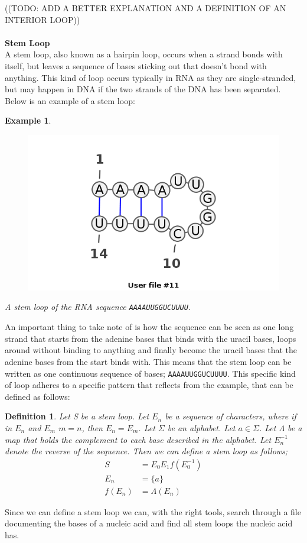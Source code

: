\documentclass{article}
\newtheorem{myex}{Example}
\newtheorem{mydef}{Definition}
\begin{document}
((TODO: ADD A BETTER EXPLANATION AND A DEFINITION OF AN INTERIOR LOOP))
\\\\
\textbf{Stem Loop}\\
A stem loop, also known as a hairpin loop, occurs when a strand bonds with 
itself, but leaves a sequence of bases sticking out that doesn't bond with anything. 
This kind of loop occurs typically in RNA as they are single-stranded, but may 
happen in DNA if the two strands of the DNA has been separated. Below is an 
example of a stem loop:
\begin{myex}\centering
\begin{figure}[h]
\includegraphics[scale=0.5]{./lib/stem-loop.png}
\end{figure}
A stem loop of the RNA sequence {\tt AAAAUUGGUCUUUU}.
\end{myex}
An important thing to take note of is how the sequence can be seen as one 
long strand that starts from the adenine bases that binds with the uracil bases, 
loops around without binding to anything and finally become the uracil bases 
that the adenine bases from the start binds with. This means that the 
stem loop can be written as one continuous sequence of bases; {\tt AAAAUUGGUCUUUU}. 
This specific kind of loop adheres to a specific pattern that reflects from 
the example, that can be defined as follows:
\begin{mydef}
\centering
Let S be a stem loop. Let $E_n$ be a sequence of characters, where if in $E_n$ 
and $E_m$ $m = n$, then $E_n =E_m$. Let $\Sigma$ be an alphabet. Let 
$a \in \Sigma$. Let $\Lambda$ be a map that holds the complement to each base 
described in the alphabet. Let $E_n^{-1}$
denote the reverse of the sequence. Then we can define a stem loop as follows;
\begin{align*}
S      &= E_0 E_1 f(E_0^{-1}) \\
E_n    &= \{a\}\\
f(E_n) &= \Lambda(E_n)
\end{align*}
\end{mydef}
Since we can define a stem loop we can, with the right tools, search through 
a file documenting the bases of a nucleic acid and find all stem loops 
the nucleic acid has.
\end{document}
